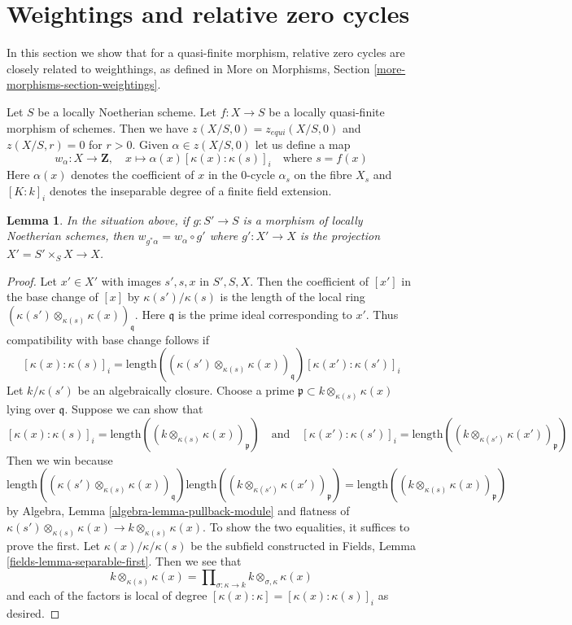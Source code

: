 \documentclass{stacks-project}
\theoremstyle{plain}
\newtheorem{lemma}[subsection]{Lemma}
\theoremstyle{definition}
\theoremstyle{remark}
\numberwithin{equation}{subsection}
\begin{document}
\section{Weightings and relative zero cycles}
\label{section-weightings}

\noindent
In this section we show that for a quasi-finite morphism,
relative zero cycles are closely related to weighthings, as defined in
More on Morphisms, Section \ref{more-morphisms-section-weightings}.

\medskip\noindent
Let $S$ be a locally Noetherian scheme. Let $f : X \to S$ be a locally
quasi-finite morphism of schemes. Then we have $z(X/S, 0) = z_{equi}(X/S, 0)$
and $z(X/S, r) = 0$ for $r > 0$. Given $\alpha \in z(X/S, 0)$ let us
define a map
$$
w_\alpha : X \longrightarrow \mathbf{Z},\quad
x \mapsto \alpha(x) [\kappa(x) : \kappa(s)]_i \quad\text{where }s = f(x)
$$
Here $\alpha(x)$ denotes the coefficient of $x$ in the $0$-cycle
$\alpha_s$ on the fibre $X_s$ and $[K : k]_i$ denotes the inseparable
degree of a finite field extension.

\begin{lemma}
\label{lemma-weightings-pre}
In the situation above, if $g : S' \to S$ is a morphism of locally
Noetherian schemes, then $w_{g^*\alpha} = w_\alpha \circ g'$ where
$g' : X' \to X$ is the projection $X' = S' \times_S X \to X$.
\end{lemma}

\begin{proof}
Let $x' \in X'$ with images $s', s, x$ in $S', S, X$.
Then the coefficient of $[x']$ in
the base change of $[x]$ by $\kappa(s')/\kappa(s)$ is the length of
the local ring $(\kappa(s') \otimes_{\kappa(s)} \kappa(x))_\mathfrak q$.
Here $\mathfrak q$ is the prime ideal corresponding to $x'$.
Thus compatibility with base change follows if
$$
[\kappa(x) : \kappa(s)]_i =
\text{length}((\kappa(s') \otimes_{\kappa(s)} \kappa(x))_\mathfrak q)
[\kappa(x') : \kappa(s')]_i
$$
Let $k/\kappa(s')$ be an algebraically closure. Choose a prime
$\mathfrak p \subset k \otimes_{\kappa(s)} \kappa(x)$ lying
over $\mathfrak q$. Suppose we can show that
$$
[\kappa(x) : \kappa(s)]_i =
\text{length}((k \otimes_{\kappa(s)} \kappa(x))_\mathfrak p)
\quad\text{and}\quad
[\kappa(x') : \kappa(s')]_i =
\text{length}((k \otimes_{\kappa(s')} \kappa(x'))_\mathfrak p)
$$
Then we win because
$$
\text{length}((\kappa(s') \otimes_{\kappa(s)} \kappa(x))_\mathfrak q)
\text{length}((k \otimes_{\kappa(s')} \kappa(x'))_\mathfrak p)
=
\text{length}((k \otimes_{\kappa(s)} \kappa(x))_\mathfrak p)
$$
by Algebra, Lemma \ref{algebra-lemma-pullback-module} and flatness of
$\kappa(s') \otimes_{\kappa(s)} \kappa(x) \to k \otimes_{\kappa(s)} \kappa(x)$.
To show the two equalities, it suffices to prove the first.
Let $\kappa(x)/\kappa/\kappa(s)$ be the subfield constructed in
Fields, Lemma \ref{fields-lemma-separable-first}. Then we see that
$$
k \otimes_{\kappa(s)} \kappa(x) =
\prod\nolimits_{\sigma : \kappa \to k}
k \otimes_{\sigma, \kappa} \kappa(x)
$$
and each of the factors is local of degree
$[\kappa(x) : \kappa] = [\kappa(x) : \kappa(s)]_i$
as desired.
\end{proof}
\end{document}
